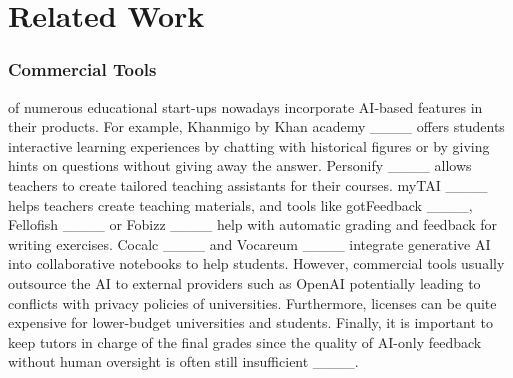 \section{Related Work}
\iffalse
Current solutions, ... => put into related work
- privacy issues: models on foreign cloud servers such as chatGPT by openai
- often rely on proprietary, closed source models
- tutors are put out of "the loop" / student solutions are stored in different files (unnecessary overhead for swapping between solutions) / feedback not immediate
- limited support to directly grade code / combine grading with unit tests
\fi

\subsubsection{Commercial Tools}
of numerous educational start-ups nowadays incorporate AI-based features in their products. For example, Khanmigo by Khan academy ____ offers students interactive learning experiences by chatting with historical figures or by giving hints on questions without giving away the answer. Personify ____ allows teachers to create tailored teaching assistants for their courses. myTAI ____ helps teachers create teaching materials, and tools like gotFeedback ____, Fellofish ____ or Fobizz ____ help with automatic grading and feedback for writing exercises. Cocalc ____ and Vocareum ____ integrate generative AI into collaborative notebooks to help students. 
However, commercial tools usually outsource the AI to external providers such as OpenAI potentially leading to conflicts with privacy policies of universities. 
Furthermore, licenses can be quite expensive for lower-budget universities and students. %
Finally, it is important to keep tutors in charge of the final grades since the quality of AI-only feedback without human oversight is often still insufficient ____.


